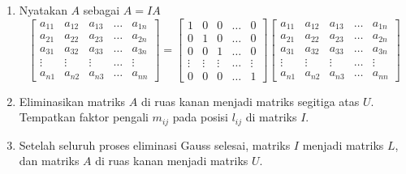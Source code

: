 \documentclass[pdflatex,compress,mathserif]{beamer}
\begin{document}
\begin{frame}
	\begin{enumerate}
		\item Nyatakan $ A $ sebagai $ A = IA $
		\[
		\begin{bmatrix}
			a_{11} & a_{12} & a_{13} & \dots & a_{1n}\\
			a_{21} & a_{22} & a_{23} & \dots & a_{2n}\\
			a_{31} & a_{32} & a_{33} & \dots & a_{3n}\\
			\vdots & \vdots & \vdots & \dots & \vdots\\
			a_{n1} & a_{n2} & a_{n3} & \dots & a_{nn}
		\end{bmatrix}
		=
		\begin{bmatrix}
			1 & 0 & 0 & \dots & 0\\
			0 & 1 & 0 & \dots & 0\\
			0 & 0 & 1 & \dots & 0\\
			\vdots & \vdots & \vdots & \dots & \vdots\\
			0 & 0 & 0 & \dots & 1
		\end{bmatrix}
		\begin{bmatrix}
			a_{11} & a_{12} & a_{13} & \dots & a_{1n}\\
			a_{21} & a_{22} & a_{23} & \dots & a_{2n}\\
			a_{31} & a_{32} & a_{33} & \dots & a_{3n}\\
			\vdots & \vdots & \vdots & \dots & \vdots\\
			a_{n1} & a_{n2} & a_{n3} & \dots & a_{nn}
		\end{bmatrix}
		\]
		\item Eliminasikan matriks $ A $ di ruas kanan menjadi matriks segitiga atas $ U $.
		Tempatkan faktor pengali $ m_{ij} $ pada posisi $ l_{ij} $ di matriks $ I $.
		\item Setelah seluruh proses eliminasi Gauss selesai, matriks $ I $ menjadi matriks $ L $, dan matriks $ A $ di ruas kanan menjadi matriks $ U $.
	\end{enumerate}
\end{frame}
\end{document}
